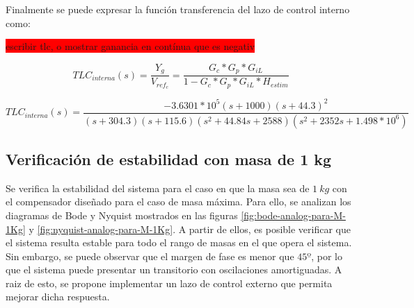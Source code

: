 Finalmente se puede expresar la función transferencia del lazo de control interno como:
%

\colorbox{red}{escribir tlc, o mostrar ganancia en contínua que es negativ}

\begin{equation}
	TLC_{interna}(s)=\frac{Y_g}{V_{ref_c}}=\frac{G_c*G_{p}*G_{iL}}{1-G_c*G_{p}*G_{iL}*H_{estim}}
\end{equation}

\begin{equation}
	TLC_{interna}(s)=\frac{-3.6301*10^5(s+1000)(s+44.3)^2}{(s+304.3) (s+115.6) (s^2 + 44.84s + 2588) (s^2 + 2352s + 1.498*10^6)}	
\end{equation}
%
%

\subsection{Verificación de estabilidad con masa de 1 kg}


\noindent Se verifica la estabilidad del sistema  para el caso en que la masa sea de $1\:kg$ con el compensador dise\~{n}ado para el caso de masa m\'{a}xima. Para ello, se analizan los diagramas de Bode y Nyquist mostrados en las figuras \ref{fig:bode-analog-para-M-1Kg} y \ref{fig:nyquist-analog-para-M-1Kg}. A partir de ellos, es posible verificar que el sistema resulta estable para todo el rango de masas en el que opera el sistema. Sin embargo, se puede observar que el margen de fase es menor que $45º$, por lo que el sistema puede presentar un transitorio con oscilaciones amortiguadas. A raiz de esto, se propone implementar un lazo de control externo que permita mejorar dicha respuesta.

